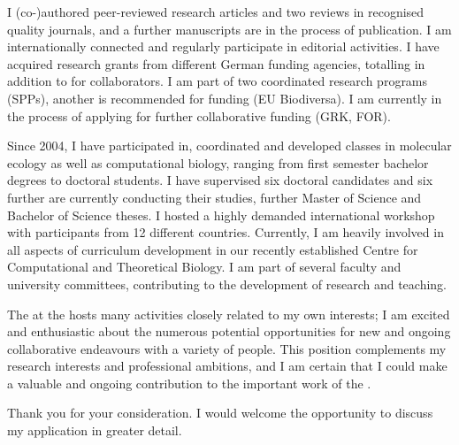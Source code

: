 I (co-)authored {\papernumber} peer-reviewed research articles and two reviews in recognised quality journals, and a further {\papernumberunpub} manuscripts are in the process of publication. I am internationally connected and regularly participate in editorial activities.
I have acquired research grants from different German funding agencies, totalling \EUR{\fundingvalue} in addition to \EUR{\cofundingvalue} for collaborators. I am part of two coordinated research programs (SPPs), another is recommended for funding (EU Biodiversa). I am currently in the process of applying for further collaborative funding (GRK, FOR).

Since 2004, I have participated in, coordinated and developed classes in molecular ecology as well as computational biology, ranging from first semester bachelor degrees to doctoral students. I have supervised six doctoral candidates and six further are currently conducting their studies, further {\supermsc} Master of Science and {\superbsc} Bachelor of Science theses. I hosted a highly demanded international workshop with participants from 12 different countries. Currently, I am heavily involved in all aspects of curriculum development in our recently established Centre for Computational and Theoretical Biology.
I am part of several faculty and university committees, contributing to the development of research and teaching.

The {\faculty} at the {\universitylong} hosts many activities closely related to my own interests; I am excited and enthusiastic about the numerous potential opportunities for new and ongoing collaborative endeavours with a variety of people. This position complements my research interests and professional ambitions, and I am certain that I could make a valuable and ongoing contribution to the important work of the {\universityshort}.

Thank you for your consideration. I would welcome the opportunity to discuss my application in greater detail.



